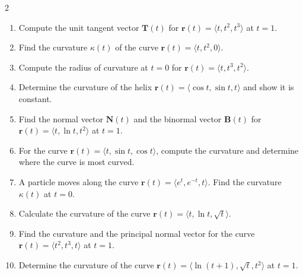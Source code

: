 \begin{multicols}{2}
\begin{enumerate}
    \item Compute the unit tangent vector \( \mathbf{T}(t) \) for \( \mathbf{r}(t) = \langle t, t^2, t^3 \rangle \) at \( t = 1 \).
    \item Find the curvature \( \kappa(t) \) of the curve \( \mathbf{r}(t) = \langle t, t^2, 0 \rangle \).
    \item Compute the radius of curvature at \( t = 0 \) for \( \mathbf{r}(t) = \langle t, t^3, t^2 \rangle \).
    \item Determine the curvature of the helix \( \mathbf{r}(t) = \langle \cos t, \sin t, t \rangle \) and show it is constant.
    \item Find the normal vector \( \mathbf{N}(t) \) and the binormal vector \( \mathbf{B}(t) \) for \( \mathbf{r}(t) = \langle t, \ln t, t^2 \rangle \) at \( t = 1 \).
    \item For the curve \( \mathbf{r}(t) = \langle t, \sin t, \cos t \rangle \), compute the curvature and determine where the curve is most curved.
    \item A particle moves along the curve \( \mathbf{r}(t) = \langle e^t, e^{-t}, t \rangle \). Find the curvature \( \kappa(t) \) at \( t = 0 \).
    \item Calculate the curvature of the curve \( \mathbf{r}(t) = \langle t, \ln t, \sqrt{t} \rangle \).
    \item Find the curvature and the principal normal vector for the curve \( \mathbf{r}(t) = \langle t^2, t^3, t \rangle \) at \( t = 1 \).
    \item Determine the curvature of the curve \( \mathbf{r}(t) = \langle \ln(t+1), \sqrt{t}, t^2 \rangle \) at \( t = 1 \).


\end{enumerate}
\end{multicols}

